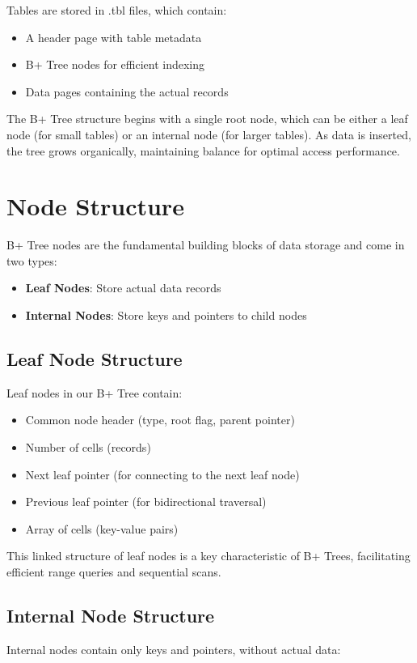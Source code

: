 \documentclass[12pt,a4paper]{article}  %
\begin{document}
Tables are stored in .tbl files, which contain:

\begin{itemize}
    \item A header page with table metadata
    \item B+ Tree nodes for efficient indexing
    \item Data pages containing the actual records
\end{itemize}

The B+ Tree structure begins with a single root node, which can be either a leaf node (for small tables) or an internal node (for larger tables). As data is inserted, the tree grows organically, maintaining balance for optimal access performance.

\section{Node Structure}

B+ Tree nodes are the fundamental building blocks of data storage and come in two types:

\begin{itemize}
    \item \textbf{Leaf Nodes}: Store actual data records
    \item \textbf{Internal Nodes}: Store keys and pointers to child nodes
\end{itemize}

\subsection{Leaf Node Structure}
Leaf nodes in our B+ Tree contain:

\begin{itemize}
    \item Common node header (type, root flag, parent pointer)
    \item Number of cells (records)
    \item Next leaf pointer (for connecting to the next leaf node)
    \item Previous leaf pointer (for bidirectional traversal)
    \item Array of cells (key-value pairs)
\end{itemize}

This linked structure of leaf nodes is a key characteristic of B+ Trees, facilitating efficient range queries and sequential scans.

\subsection{Internal Node Structure}
Internal nodes contain only keys and pointers, without actual data:
\end{document}
